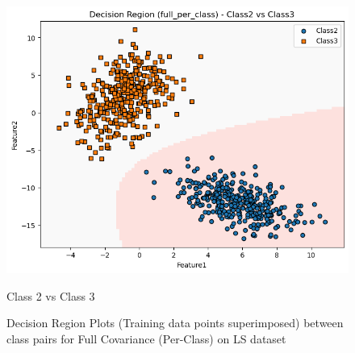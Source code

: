 \begin{figure}[H]
    \begin{minipage}{0.32\linewidth}
        \includegraphics[width=\linewidth]{images/LS_Group04_images/04_full_per_class/04_decision_region_c2_c3.png}
        \caption*{Class 2 vs Class 3}
    \end{minipage}
    \caption{Decision Region Plots (Training data points superimposed) between class pairs for Full Covariance (Per-Class) on LS dataset}
\end{figure}